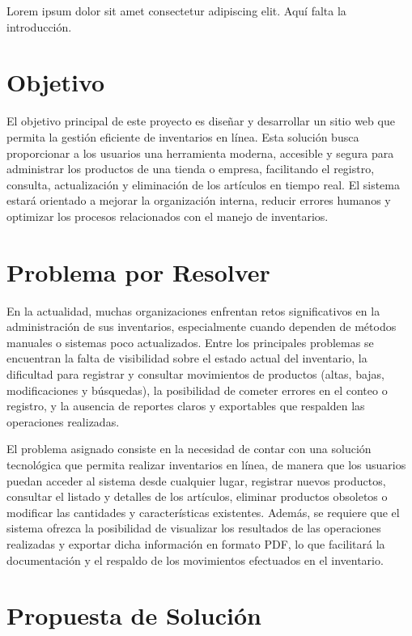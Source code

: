 Lorem ipsum dolor sit amet consectetur adipiscing elit. Aquí falta la introducción.

\section{Objetivo}

El objetivo principal de este proyecto es diseñar y desarrollar un sitio web que permita la gestión eficiente de inventarios en línea. Esta solución busca proporcionar a los usuarios una herramienta moderna, accesible y segura para administrar los productos de una tienda o empresa, facilitando el registro, consulta, actualización y eliminación de los artículos en tiempo real. El sistema estará orientado a mejorar la organización interna, reducir errores humanos y optimizar los procesos relacionados con el manejo de inventarios.

\section{Problema por Resolver}

En la actualidad, muchas organizaciones enfrentan retos significativos en la administración de sus inventarios, especialmente cuando dependen de métodos manuales o sistemas poco actualizados. Entre los principales problemas se encuentran la falta de visibilidad sobre el estado actual del inventario, la dificultad para registrar y consultar movimientos de productos (altas, bajas, modificaciones y búsquedas), la posibilidad de cometer errores en el conteo o registro, y la ausencia de reportes claros y exportables que respalden las operaciones realizadas.

El problema asignado consiste en la necesidad de contar con una solución tecnológica que permita realizar inventarios en línea, de manera que los usuarios puedan acceder al sistema desde cualquier lugar, registrar nuevos productos, consultar el listado y detalles de los artículos, eliminar productos obsoletos o modificar las cantidades y características existentes. Además, se requiere que el sistema ofrezca la posibilidad de visualizar los resultados de las operaciones realizadas y exportar dicha información en formato PDF, lo que facilitará la documentación y el respaldo de los movimientos efectuados en el inventario.

\section{Propuesta de Solución}

